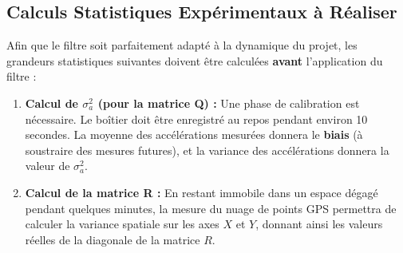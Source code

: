 \subsection{Calculs Statistiques Expérimentaux à Réaliser}
Afin que le filtre soit parfaitement adapté à la dynamique du projet, les grandeurs statistiques suivantes doivent être calculées \textbf{avant} l'application du filtre :
\begin{enumerate}
    \item \textbf{Calcul de $\sigma_a^2$ (pour la matrice Q) :} 
    Une phase de calibration est nécessaire. Le boîtier doit être enregistré au repos pendant environ 10 secondes. La moyenne des accélérations mesurées donnera le \textbf{biais} (à soustraire des mesures futures), et la variance des accélérations donnera la valeur de $\sigma_a^2$.
    \item \textbf{Calcul de la matrice R :}
    En restant immobile dans un espace dégagé pendant quelques minutes, la mesure du nuage de points GPS permettra de calculer la variance spatiale sur les axes $X$ et $Y$, donnant ainsi les valeurs réelles de la diagonale de la matrice $R$.
\end{enumerate}

